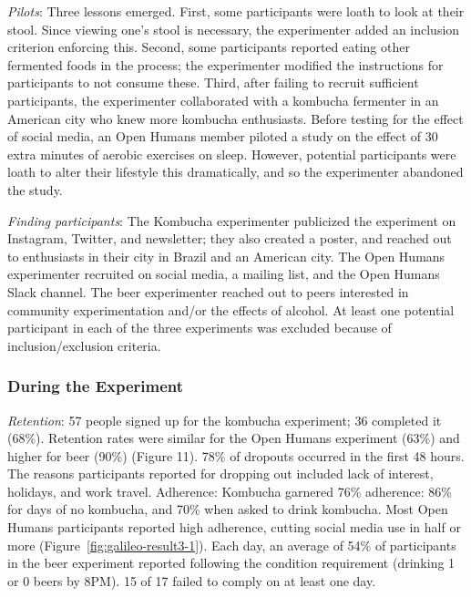 \textit{Pilots}: Three lessons emerged. First, some participants were loath to look at their stool. Since viewing one's stool is necessary, the experimenter added an inclusion criterion enforcing this. Second, some participants reported eating other fermented foods in the process; the experimenter modified the instructions for participants to not consume these. Third, after failing to recruit sufficient participants, the experimenter collaborated with a kombucha fermenter in an American city who knew more kombucha enthusiasts. Before testing for the effect of social media, an Open Humans member piloted a study on the effect of 30 extra minutes of aerobic exercises on sleep. However, potential participants were loath to alter their lifestyle this dramatically, and so the experimenter abandoned the study.
 
\textit{Finding participants}: The Kombucha experimenter publicized the experiment on Instagram, Twitter, and newsletter; they also created a poster, and reached out to enthusiasts in their city in Brazil and an American city. The Open Humans experimenter recruited on social media, a mailing list, and the Open Humans Slack channel. The beer experimenter reached out to peers interested in community experimentation and/or the effects of alcohol. At least one potential participant in each of the three experiments was excluded because of inclusion/exclusion criteria. 

\subsubsection{During the Experiment}
\textit{Retention}: 57 people signed up for the kombucha experiment; 36 completed it (68\%). Retention rates were similar for the Open Humans experiment (63\%) and higher for beer (90\%) (Figure 11). 78\% of dropouts occurred in the first 48 hours. The reasons participants reported for dropping out included lack of interest, holidays, and work travel.
Adherence: Kombucha garnered 76\% adherence: 86\% for days of no kombucha, and 70\% when asked to drink kombucha. Most Open Humans participants reported high adherence, cutting social media use in half or more (Figure~\ref{fig:galileo-result3-1}). Each day, an average of 54\% of participants in the beer experiment reported following the condition requirement (drinking 1 or 0 beers by 8PM). 15 of 17 failed to comply on at least one day.

